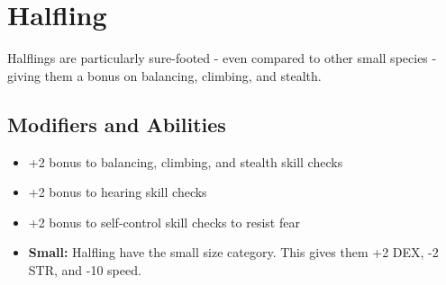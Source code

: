 \section{Halfling}\label{halfling}
Halflings are particularly sure-footed - even compared to other small species -
giving them a bonus on balancing, climbing, and stealth.

\subsection*{Modifiers and Abilities}
\begin{itemize}
    \item +2 bonus to balancing, climbing, and stealth skill checks
    \item +2 bonus to hearing skill checks
    \item +2 bonus to self-control skill checks to resist fear
    \item \textbf{Small:} Halfling have the small size category. This gives
        them +2 DEX, -2 STR, and -10 speed.
\end{itemize}
